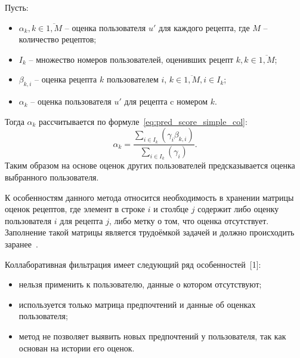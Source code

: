 Пусть:
\begin{itemize}
    \item $\alpha_k, k \in \overline{1, M}$ -- оценка пользователя $u'$ для каждого рецепта, где $M$ -- количество рецептов;
    \item $I_k$ -- множество номеров пользователей, оценивших рецепт $k, k \in \overline{1, M}$;
    \item $\beta_{k,i}$ -- оценка рецепта $k$ пользователем $i$, $k \in \overline{1, M}, i \in I_k$;
    \item $\alpha_k$ -- оценка пользователя $u'$ для рецепта c номером $k$.
\end{itemize}
Тогда $\alpha_k$ рассчитывается по формуле~\eqref{eq:pred_score_simple_col}:
\begin{equation}
\label{eq:pred_score_simple_col}
    \alpha_k = \frac{\sum\limits_{i \in I_k} (\gamma_i\beta_{k,i})}{\sum\limits_{i \in I_k} (\gamma_i)}.
\end{equation}
Таким образом на основе оценок других пользователей предсказывается оценка выбранного пользователя.

К особенностям данного метода относится необходимость в хранении матрицы оценок рецептов, где элемент в строке $i$ и столбце $j$ содержит либо оценку пользователя $i$ для рецепта $j$, либо метку о том, что оценка отсутствует.
Заполнение такой матрицы является трудоёмкой задачей и должно происходить заранее~\cite{segaran}.

Коллаборативная фильтрация имеет следующий ряд особенностей~[1]:
\begin{itemize}
    \item нельзя применить к пользователю, данные о котором отсутствуют;
    \item используется только матрица предпочтений и данные об оценках пользователя;
    \item метод не позволяет выявить новых предпочтений у пользователя, так как основан на истории его оценок.
\end{itemize}

